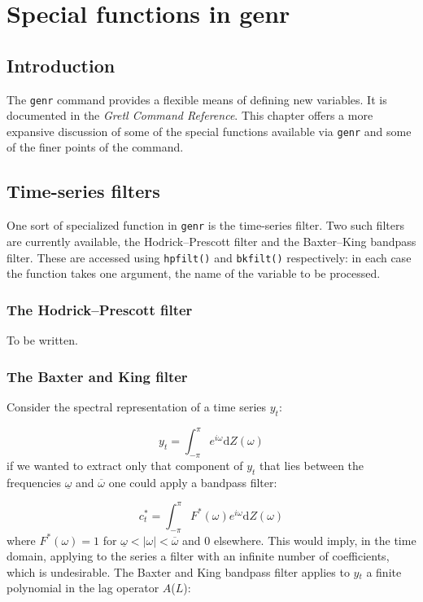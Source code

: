 \chapter{Special functions in genr}
\label{chap-genr}



\section{Introduction}
\label{genr-intro}

The \verb+genr+ command provides a flexible means of
      defining new variables.  It is documented in the \emph{Gretl Command
	Reference}.  This chapter offers a more expansive discussion
      of some of the special functions available via \verb+genr+ and
      some of the finer points of the command.
    

\section{Time-series filters}
\label{genr-filter}

One sort of specialized function in \verb+genr+ is the
      time-series filter.  Two such filters are currently available, the
      Hodrick--Prescott filter and the Baxter--King bandpass filter. These
      are accessed using \verb+hpfilt()+ and \verb+bkfilt()+
      respectively: in each case the function takes one argument, the name of the
      variable to be processed.
    

\subsection{The Hodrick--Prescott filter}
\label{hodrick-prescott}

To be written.

\subsection{The Baxter and King filter}
\label{baxter-king}

Consider the spectral representation of a time series $y_t$:
	
	    \[ y_t = \int_{-\pi}^{\pi} e^{i\omega} \mathrm{d} Z(\omega) \]
	   if we wanted to extract only that component of
	$y_t$ that lies between the
	frequencies 
        $\underline{\omega}$ and
        $\overline{\omega}$ one could apply a bandpass filter:
	
	    \[ c^*_t = \int_{-\pi}^{\pi} F^*(\omega) e^{i\omega} \mathrm{d}
	    Z(\omega) \]
	   where 
        $F^*(\omega) = 1$ for
        $\underline{\omega} < |\omega| < \overline{\omega}$ and 0 elsewhere. This would imply, in the time domain,
	applying to the series a filter with an infinite number of coefficients,
	which is undesirable. The Baxter and King bandpass filter applies to
	$y\ensuremath{_{t}}$ a finite polynomial in the
	lag operator $A$($L$):
	
